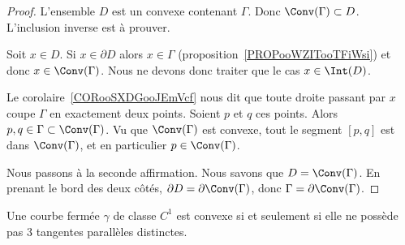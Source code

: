 \begin{proof}
	L'ensemble \( D\) est un convexe contenant \( \Gamma\). Donc \( \Conv(\Gamma)\subset D\). L'inclusion inverse est à prouver.

	Soit \( x\in D\). Si \( x\in \partial D\) alors \( x\in \Gamma\) (proposition~\ref{PROPooWZITooTFiWsi}) et donc \( x\in\Conv(\Gamma)\). Nous ne devons donc traiter que le cas \( x\in\Int(D)\).

	Le corolaire~\ref{CORooSXDGooJEmVcf} nous dit que toute droite passant par \( x\) coupe \( \Gamma\) en exactement deux points. Soient \( p\) et \( q\) ces points. Alors \( p,q\in \Gamma\subset \Conv(\Gamma)\). Vu que \( \Conv(\Gamma) \) est convexe, tout le segment \( [p,q]\) est dans \( \Conv(\Gamma)\), et en particulier \( p\in\Conv(\Gamma)\).

	Nous passons à la seconde affirmation. Nous savons que \( D=\Conv(\Gamma)\). En prenant le bord des deux côtés, \( \partial D=\partial\Conv(\Gamma)\), donc \( \Gamma=\partial\Conv(\Gamma)\).
\end{proof}

\begin{lemma}        \label{LEMooUEKQooWhGyKn}
	Une courbe fermée \( \gamma\) de classe \( C^1\) est convexe si et seulement si elle ne possède pas \( 3\) tangentes parallèles distinctes.
\end{lemma}

